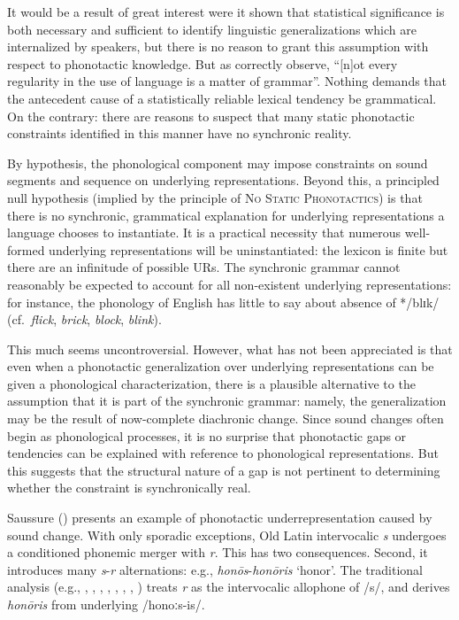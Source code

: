It would be a result of great interest were it shown that statistical significance is both necessary and sufficient to identify linguistic generalizations which are internalized by speakers, but there is no reason to grant this assumption with respect to phonotactic knowledge.
But as \citet[330]{Zwicky1987a} correctly observe, ``[n]ot every regularity in the use of language is a matter of grammar''.
Nothing demands that the antecedent cause of a statistically reliable lexical tendency be grammatical.
On the contrary: there are reasons to suspect that many static phonotactic constraints identified in this manner have no synchronic reality.

By hypothesis, the phonological component may impose constraints on sound segments and sequence on underlying representations.
Beyond this, a principled null hypothesis (implied by the principle of \textsc{No Static Phonotactics}) is that there is no synchronic, grammatical explanation for underlying representations a language chooses to instantiate.
It is a practical necessity that numerous well-formed underlying representations will be uninstantiated: the lexicon is finite but there are an infinitude of possible URs.
The synchronic grammar cannot reasonably be expected to account for all non-existent underlying representations: for instance, the phonology of English has little to say about absence of */blɪk/ (cf.~\emph{flick}, \emph{brick}, \emph{block}, \emph{blink}).

This much seems uncontroversial.
However, what has not been appreciated is that even when a phonotactic generalization over underlying representations can be given a phonological characterization, there is a plausible alternative to the assumption that it is part of the synchronic grammar: namely, the generalization may be the result of now-complete diachronic change.
Since sound changes often begin as phonological processes, it is no surprise that phonotactic gaps or tendencies can be explained with reference to phonological representations.
But this suggests that the structural nature of a gap is not pertinent to determining whether the constraint is synchronically real.

Saussure (\citeyear{CLG}) presents an example of phonotactic underrepresentation caused by sound change.
With only sporadic exceptions, Old Latin intervocalic \emph{s} undergoes a conditioned phonemic merger with \emph{r}.
This has two consequences.
Second, it introduces many \emph{s}-\emph{r} alternations: e.g., \emph{honōs}-\emph{honōris} `honor'.
The traditional analysis (e.g., \citealt[62]{Foley1965}, \citealt[142]{Gruber2006}, \citealt[134]{Heslin1987}, \citealt[377]{Kenstowicz1996}, \citealt[314]{Klausenburger1976}, \citealt[19]{Matthews1972a}, \citealt[88]{Roberts2012}, \citealt[526]{Watkins1970}) treats \emph{r} as the intervocalic allophone of /s/, and derives \emph{honōris} from underlying /honoːs-is/.
 
